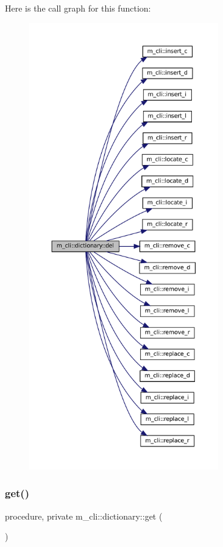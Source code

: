 Here is the call graph for this function\+:
\nopagebreak
\begin{figure}[H]
\begin{center}
\leavevmode
\includegraphics[height=550pt]{structm__cli_1_1dictionary_aea651d5f1d801e67a9af3ebb863c537c_cgraph}
\end{center}
\end{figure}
\mbox{\label{structm__cli_1_1dictionary_a00a446dbb6b83b8656f681c5d8ee6c3b}} 
\subsubsection{\texorpdfstring{get()}{get()}}
{\footnotesize\ttfamily procedure, private m\+\_\+cli\+::dictionary\+::get (\begin{DoxyParamCaption}{ }\end{DoxyParamCaption})\hspace{0.3cm}{\ttfamily [private]}}

